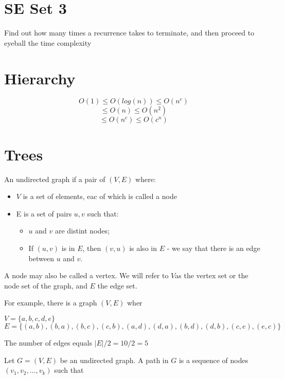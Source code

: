 \documentclass[fontsize=4pt]{scrartcl}
\begin{document}
\begin{multicols}{3}
\begin{itemize}
    \end{itemize}


    \section{SE Set 3}
    Find out how many times a recurrence takes to terminate, and then proceed to eyeball the time complexity

    \section{Hierarchy}
    $$O(1) \leqslant O(log(n)) \leqslant O(n^c)$$ 
    $$\leqslant O(n) \leqslant O(n^2)$$ 
    $$\leqslant O(n^c) \leqslant O(c^n)$$

    \section{Trees}

    An undirected graph if a pair of $(V, E)$ where:

    \begin{itemize}
        \item $V$ is a set of elements, eac of which is called a node
        \item E is a set of pairs $u, v$ such that:
        \begin{itemize}
            \item $u$ and $v$ are distint nodes;
            \item If $(u, v)$ is in $E$, then $(v, u)$ is also in $E$ - we say that there is an edge between $u$ and $v$.
        \end{itemize} 
    \end{itemize}

    A node may also be called a vertex. We will refer to $V$as the vertex set or the node set of the graph, and $E$ the edge set.

    For example, there is a graph $(V, E)$ wher 

    $V = \{ a, b, c, d, e\}$
    $E = \{ (a, b),(b, a),(b, c),(c, b),(a, d),(d, a),(b, d), (d, b), (c, e),(e, c) \}$

    The number of edges equals $|E| / 2 = 10 / 2 = 5$

    Let $G = (V, E)$ be an undirected graph. A path in $G$ is a sequence of nodes $(v_1, v_2, ..., v_k)$ such that


\end{multicols}
\end{document}
